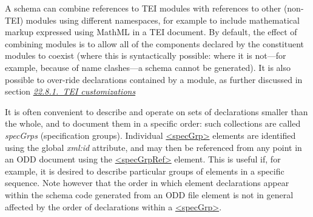 A schema can combine references to TEI modules with references to other (non-TEI) modules using different namespaces, for example to include mathematical markup expressed using MathML in a TEI document. By default, the effect of combining modules is to allow all of the components declared by the constituent modules to coexist (where this is syntactically possible: where it is not—for example, because of name clashes—a schema cannot be generated). It is also possible to over-ride declarations contained by a module, as further discussed in section \textit{\hyperref[TDbuild]{22.8.1.\ TEI customizations}}\par
It is often convenient to describe and operate on sets of declarations smaller than the whole, and to document them in a specific order: such collections are called \textit{specGrps} (specification groups). Individual \hyperref[TEI.specGrp]{<specGrp>} elements are identified using the global {\itshape xml:id} attribute, and may then be referenced from any point in an ODD document using the \hyperref[TEI.specGrpRef]{<specGrpRef>} element. This is useful if, for example, it is desired to describe particular groups of elements in a specific sequence. Note however that the order in which element declarations appear within the schema code generated from an ODD file element is not in general affected by the order of declarations within a \hyperref[TEI.specGrp]{<specGrp>}.\par
